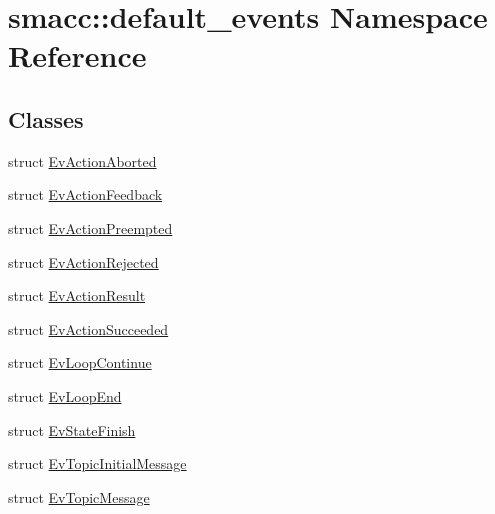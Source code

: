 \hypertarget{namespacesmacc_1_1default__events}{}\section{smacc\+:\+:default\+\_\+events Namespace Reference}
\label{namespacesmacc_1_1default__events}
\subsection*{Classes}
\begin{DoxyCompactItemize}
\item 
struct \hyperlink{structsmacc_1_1default__events_1_1EvActionAborted}{Ev\+Action\+Aborted}
\item 
struct \hyperlink{structsmacc_1_1default__events_1_1EvActionFeedback}{Ev\+Action\+Feedback}
\item 
struct \hyperlink{structsmacc_1_1default__events_1_1EvActionPreempted}{Ev\+Action\+Preempted}
\item 
struct \hyperlink{structsmacc_1_1default__events_1_1EvActionRejected}{Ev\+Action\+Rejected}
\item 
struct \hyperlink{structsmacc_1_1default__events_1_1EvActionResult}{Ev\+Action\+Result}
\item 
struct \hyperlink{structsmacc_1_1default__events_1_1EvActionSucceeded}{Ev\+Action\+Succeeded}
\item 
struct \hyperlink{structsmacc_1_1default__events_1_1EvLoopContinue}{Ev\+Loop\+Continue}
\item 
struct \hyperlink{structsmacc_1_1default__events_1_1EvLoopEnd}{Ev\+Loop\+End}
\item 
struct \hyperlink{structsmacc_1_1default__events_1_1EvStateFinish}{Ev\+State\+Finish}
\item 
struct \hyperlink{structsmacc_1_1default__events_1_1EvTopicInitialMessage}{Ev\+Topic\+Initial\+Message}
\item 
struct \hyperlink{structsmacc_1_1default__events_1_1EvTopicMessage}{Ev\+Topic\+Message}
\end{DoxyCompactItemize}
